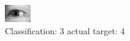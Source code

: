 \begin{figure}[h!]
\begin{center}
\includegraphics[width=0.60\columnwidth]{figures/ID3204_class_3_target_4.png}
\end{center}
\caption{ Classification: 3 actual target: 4}
\label{fig:ID3204_class_3_target_4}
\end{figure}
